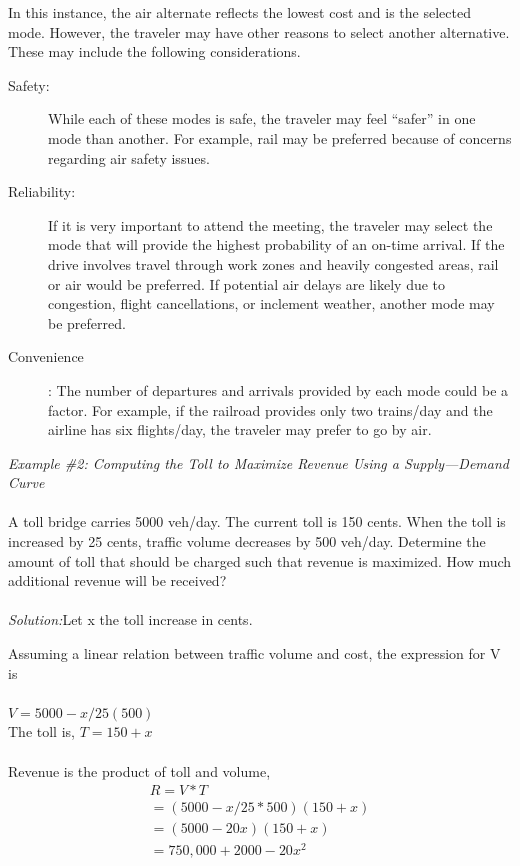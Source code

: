 In this instance, the air alternate reflects the lowest cost and is the selected mode. However, the traveler may have other reasons to select another alternative. These may include the following considerations.
\begin{description}
	\item [Safety:]While each of these modes is safe, the traveler may feel “safer” in one mode than another. For example, rail may be preferred because of concerns regarding air safety issues.
	\item [Reliability:] If it is very important to attend the meeting, the traveler may select the mode that will provide the highest probability of an on-time arrival. If the drive involves travel through work zones and heavily congested areas, rail or air would be preferred. If potential air delays are likely due to congestion, flight cancellations, or inclement weather, another mode may be preferred.
	\item [Convenience]: The number of departures and arrivals provided by each mode could be a factor. For example, if the railroad provides only two trains/day and the airline has six flights/day, the traveler may prefer to go by air.
\end{description}
%
\emph{Example \#2: Computing the Toll to Maximize Revenue Using a Supply—Demand Curve}\\\\
A toll bridge carries 5000 veh/day. The current toll is 150 cents. When the toll is increased by 25 cents, traffic volume decreases by 500 veh/day. Determine the amount of toll that should be charged such that revenue is maximized. How much additional revenue will be received?\\\\
\emph{Solution:}Let x the toll increase in cents.
\par
Assuming a linear relation between traffic volume and cost, the expression
for V is\\\\
$V = 5000 - x/25 (500)$\\
The toll is, $T = 150 + x$\\\\
Revenue is the product of toll and volume,
\begin{gather*}
	R = V * T\\
	= (5000 - x/25 * 500)(150 + x)\\
	= (5000 - 20x)(150 + x)\\
	= 750,000 + 2000 - 20x^2
\end{gather*}
